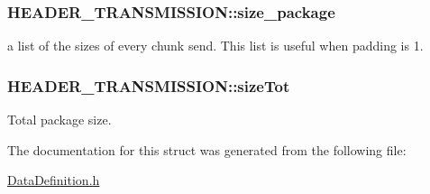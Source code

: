\hypertarget{structHEADER__TRANSMISSION_a08672f07c936f6bc4127fe255ea0ce7e}{
\subsubsection[{size\-\_\-package}]{\setlength{\rightskip}{0pt plus 5cm}H\-E\-A\-D\-E\-R\-\_\-\-T\-R\-A\-N\-S\-M\-I\-S\-S\-I\-O\-N\-::size\-\_\-package}}\label{structHEADER__TRANSMISSION_a08672f07c936f6bc4127fe255ea0ce7e}


a list of the sizes of every chunk send. This list is useful when padding is 1. 

\hypertarget{structHEADER__TRANSMISSION_a0654a40688064ef0925896891de48b43}{
\subsubsection[{size\-Tot}]{\setlength{\rightskip}{0pt plus 5cm}H\-E\-A\-D\-E\-R\-\_\-\-T\-R\-A\-N\-S\-M\-I\-S\-S\-I\-O\-N\-::size\-Tot}}\label{structHEADER__TRANSMISSION_a0654a40688064ef0925896891de48b43}


Total package size. 



The documentation for this struct was generated from the following file\-:\begin{DoxyCompactItemize}
\item 
\hyperlink{DataDefinition_8h}{Data\-Definition.\-h}\end{DoxyCompactItemize}
